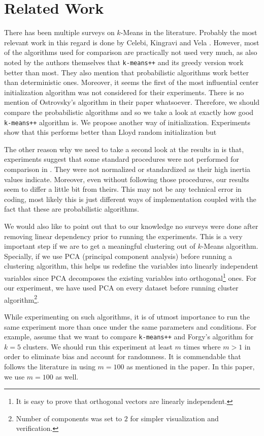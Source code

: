 \documentclass[10pt, leqno]{article}
\begin{document}
	\section{Related Work}
	There has been multiple surveys on $k$-Means in the literature. Probably the most relevant work in this regard is done by Celebi, Kingravi and Vela \cite{celebi}. However, most of the algorithms used for comparison are practically not used very much, as also noted by the authors themselves that \texttt{k-means++} and its greedy version work better than most. They also mention that probabilistic algorithms work better than deterministic ones. Moreover, it seems the first of the most influential center initialization algorithm \cite{ostrovsky} was not considered for their experiments. There is no mention of Ostrovsky's algorithm in their paper whatsoever. Therefore, we should compare the probabilistic algorithms and so we take a look at exactly how good \texttt{k-means++} algorithm is. We propose another way of initialization. Experiments show that this performs better than Lloyd random initialization but 
	
	The other reason why we need to take a second look at the results in \cite{kmeans++} is that, experiments suggest that some standard procedures were not performed for comparison in \cite{kmeans++}. They were not normalized or standardized as their high inertia values  indicate. Moreover, even without following those procedures, our results seem to differ a little bit from theirs. This may not be any technical error in coding, most likely this is just different ways of implementation coupled with the fact that these are probabilistic algorithms.
	
	We would also like to point out that to our knowledge no surveys were done after removing linear dependency prior to running the experiments. This is a very important step if we are to get a meaningful clustering out of $k$-Means algorithm. Specially, if we use PCA (principal component analysis) before running a clustering algorithm, this helps us redefine the variables into linearly independent variables since PCA decomposes the existing variables into orthogonal\footnote{It is easy to prove that orthogonal vectors are linearly independent.} ones. For our experiment, we have used PCA on every dataset before running cluster algorithm\footnote{Number of components was set to $2$ for simpler visualization and verification.}.
	
	While experimenting on such algorithms, it is of utmost importance to run the same experiment more than once under the same parameters and conditions. For example, assume that we want to compare \texttt{k-means++} and Forgy's algorithm \cite{forgy} for $k=5$ clusters. We should run this experiment at least $m$ times where $m>1$ in order to eliminate bias and account for randomness. It is commendable that \cite{celebi} follows the literature in using $m=100$ as mentioned in the paper. In this paper, we use $m=100$ as well.
	
\end{document}
